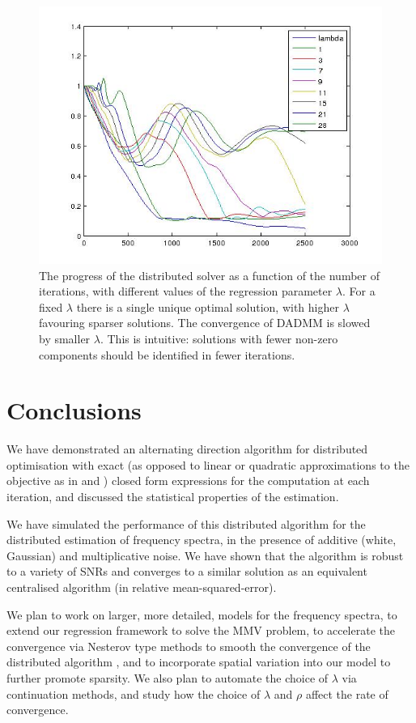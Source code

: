\documentclass[conference]{IEEEtran}
\begin{document}
\begin{figure}[h]
\centering
\includegraphics[height = 7.3 cm]{continuations_errors.jpg}
\caption{The progress of the distributed solver as a function of the number of iterations, with different values of the regression parameter \( \lambda \). For a fixed \( \lambda \) there is a single unique optimal solution, with higher \( \lambda \) favouring sparser solutions. The convergence of DADMM is slowed by smaller \( \lambda \). This is intuitive: solutions with fewer non-zero components should be identified in fewer iterations.}
\label{fig:differentLambda}
\end{figure}

\section{Conclusions}
We have demonstrated an alternating direction algorithm for distributed optimisation with exact (as opposed to linear or quadratic approximations to the objective as in \cite{mokhtari2015dqm} and \cite{ling2014dlm}) closed form expressions for the computation at each iteration, and discussed the statistical properties of the estimation. 

We have simulated the performance of this distributed algorithm for the distributed estimation of frequency spectra, in the presence of additive (white, Gaussian) and multiplicative noise. We have shown that the algorithm is robust to a variety of SNRs and converges to a similar solution as an equivalent centralised algorithm (in relative mean-squared-error).

We plan to work on larger, more detailed, models for the frequency spectra, to extend our regression framework to solve the MMV problem, to accelerate the convergence via Nesterov type methods to smooth the convergence of the distributed algorithm \cite{goldstein2014fast}, and to incorporate spatial variation into our model to further promote sparsity. We also plan to automate the choice of \(\lambda\) via continuation methods, and study how the choice of \(\lambda\) and \(\rho\) affect the rate of convergence. 


\end{document}
